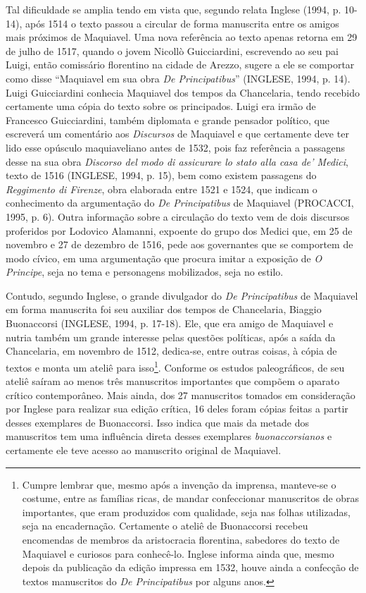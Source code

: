 Tal dificuldade se amplia tendo em vista que, segundo relata Inglese
(1994, p. 10- 14), após 1514 o texto passou a circular de forma
manuscrita entre os amigos mais próximos de Maquiavel. Uma nova
referência ao texto apenas retorna em 29 de julho de 1517, quando o
jovem Nicollò Guicciardini, escrevendo ao seu pai Luigi, então
comissário florentino na cidade de Arezzo, sugere a ele se comportar
como disse ``Maquiavel em sua obra \emph{De Principatibus}'' (INGLESE,
1994, p. 14). Luigi Guicciardini conhecia Maquiavel dos tempos da
Chancelaria, tendo recebido certamente uma cópia do texto sobre os
principados. Luigi era irmão de Francesco Guicciardini, também diplomata
e grande pensador político, que escreverá um comentário aos
\emph{Discursos} de Maquiavel e que certamente deve ter lido esse
opúsculo maquiaveliano antes de 1532, pois faz referência a passagens
desse na sua obra \emph{Discorso del modo di assicurare lo stato alla
casa de' Medici}, texto de 1516 (INGLESE, 1994, p. 15), bem como existem
passagens do \emph{Reggimento di Firenze}, obra elaborada entre 1521 e
1524, que indicam o conhecimento da argumentação do \emph{De
Principatibus} de Maquiavel (PROCACCI, 1995, p. 6). Outra informação
sobre a circulação do texto vem de dois discursos proferidos por
Lodovico Alamanni, expoente do grupo dos Medici que, em 25 de novembro e
27 de dezembro de 1516, pede aos governantes que se comportem de modo
cívico, em uma argumentação que procura imitar a exposição de \emph{O
Principe}, seja no tema e personagens mobilizados, seja no estilo.

Contudo, segundo Inglese, o grande divulgador do \emph{De Principatibus}
de Maquiavel em forma manuscrita foi seu auxiliar dos tempos de
Chancelaria, Biaggio Buonaccorsi (INGLESE, 1994, p. 17-18). Ele, que era
amigo de Maquiavel e nutria também um grande interesse pelas questões
políticas, após a saída da Chancelaria, em novembro de 1512, dedica-se,
entre outras coisas, à cópia de textos e monta um ateliê para
isso\footnote{Cumpre lembrar que, mesmo após a invenção da imprensa,
  manteve-se o costume, entre as famílias ricas, de mandar confeccionar
  manuscritos de obras importantes, que eram produzidos com qualidade,
  seja nas folhas utilizadas, seja na encadernação. Certamente o ateliê
  de Buonaccorsi recebeu encomendas de membros da aristocracia
  florentina, sabedores do texto de Maquiavel e curiosos para
  conhecê-lo. Inglese informa ainda que, mesmo depois da publicação da
  edição impressa em 1532, houve ainda a confecção de textos manuscritos
  do \emph{De Principatibus} por alguns anos.}. Conforme os estudos
paleográficos, de seu ateliê saíram ao menos três manuscritos
importantes que compõem o aparato crítico contemporâneo. Mais ainda, dos
27 manuscritos tomados em consideração por Inglese para realizar sua
edição crítica, 16 deles foram cópias feitas a partir desses exemplares
de Buonaccorsi. Isso indica que mais da metade dos manuscritos tem uma
influência direta desses exemplares \emph{buonaccorsianos} e certamente
ele teve acesso ao manuscrito original de Maquiavel.

